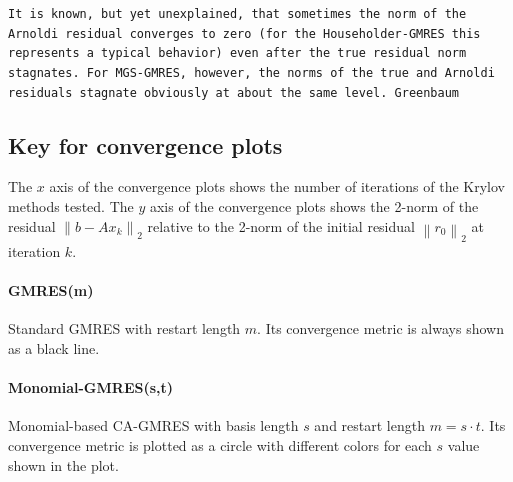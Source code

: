 \documentclass{scrartcl}
\numberwithin{equation}{section}
\newcommand{\norm}[1]{\left\lVert#1\right\rVert}
\begin{document}
\texttt{It is known, but yet unexplained, that sometimes the norm of the Arnoldi residual converges to zero (for the Householder-GMRES this represents a typical behavior) even after the true residual norm stagnates. For MGS-GMRES, however, the norms of the true and Arnoldi residuals stagnate obviously at about the same level. Greenbaum~\cite{Greenbaum97numericalbehaviour}}

\subsection{Key for convergence plots}
The $x$ axis of the convergence plots shows the number of iterations of the Krylov methods tested. The $y$ axis of the convergence plots shows the 2-norm of the residual $\norm{b - Ax_k}_2$ relative to the 2-norm of the initial residual $\norm{r_0}_2$ at iteration $k$.
\paragraph{GMRES(m)} Standard GMRES with restart length $m$. Its convergence metric is always shown as a black line.

\paragraph{Monomial-GMRES(s,t)} Monomial-based CA-GMRES with basis length $s$ and restart length $m = s \cdot t$. Its convergence metric is plotted as a circle with different colors for each $s$ value shown in the plot.
\end{document}
